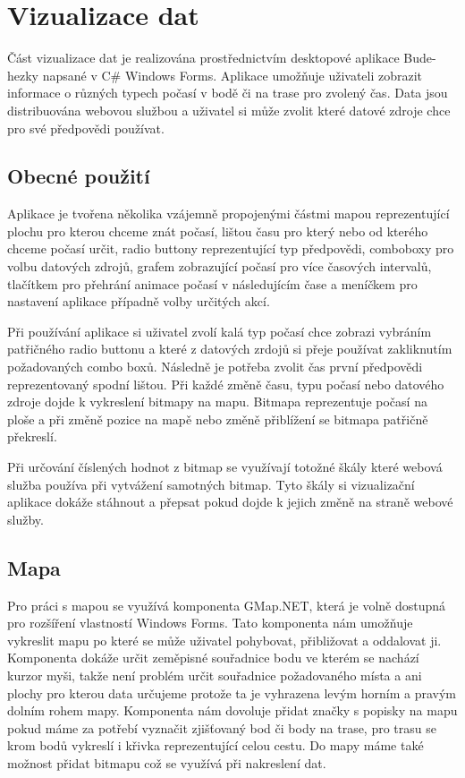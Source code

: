 \documentclass[czech,bachelor,dept460,male,csharp,cpdeclaration]{diploma}
\begin{document}
	\section{Vizualizace dat}
	
	Část vizualizace dat je realizována prostřednictvím desktopové aplikace Bude-hezky napsané v C\# Windows Forms. Aplikace umožňuje uživateli zobrazit informace o různých typech počasí v bodě či na trase pro zvolený čas. Data jsou distribuována webovou službou a uživatel si může zvolit které datové zdroje chce pro své předpovědi používat.
	
	\subsection{Obecné použití}
	
	Aplikace je tvořena několika vzájemně propojenými částmi mapou reprezentující plochu pro kterou chceme znát počasí, lištou času pro který nebo od kterého chceme počasí určit, radio buttony reprezentující typ předpovědi, comboboxy pro volbu datových zdrojů, grafem zobrazující počasí pro více časových intervalů, tlačítkem pro přehrání animace počasí v následujícím čase a meníčkem pro nastavení aplikace případně volby určitých akcí.
	
	Při používání aplikace si uživatel zvolí kalá typ počasí chce zobrazi vybráním patřičného radio buttonu a které z datových zrdojů si přeje používat zakliknutím požadovaných combo boxů. Následně je potřeba zvolit čas první předpovědi reprezentovaný spodní lištou. Při každé změně času, typu počasí nebo datového zdroje dojde k vykreslení bitmapy na mapu. Bitmapa reprezentuje počasí na ploše a při změně pozice na mapě nebo změně přiblížení se bitmapa patřičně překreslí.
	
	Při určování číslených hodnot z bitmap se využívají totožné škály které webová služba používa při vytvážení samotných bitmap. Tyto škály si vizualizační aplikace dokáže stáhnout a přepsat pokud dojde k jejich změně na straně webové služby.
	
	\subsection{Mapa}
	
	Pro práci s mapou se využívá komponenta GMap.NET, která je volně dostupná pro rozšíření vlastností Windows Forms. Tato komponenta nám umožňuje vykreslit mapu po které se může uživatel pohybovat, přibližovat a oddalovat ji. Komponenta dokáže určit zeměpisné souřadnice bodu ve kterém se nachází kurzor myši, takže není problém určit souřadnice požadovaného místa a ani plochy pro kterou data určujeme protože ta je vyhrazena levým horním a pravým dolním rohem mapy. Komponenta nám dovoluje přidat značky s popisky na mapu pokud máme za potřebí vyznačit zjišťovaný bod či body na trase, pro trasu se krom bodů vykreslí i křivka reprezentující celou cestu. Do mapy máme také možnost přidat bitmapu což se využívá při nakreslení dat.
	
\end{document}
